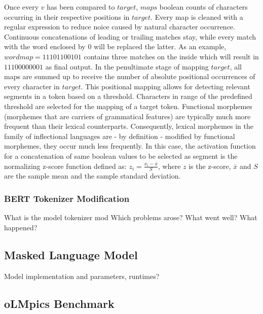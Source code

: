 Once every $v$ has been compared to $target$, $maps$ boolean counts of characters occurring in their respective positions in $target$.
Every map is cleaned with a regular expression to reduce noice caused by natural character occurrence.
Continuous concatenations of leading or trailing matches stay, while every match with the word enclosed by $0$ will be replaced the latter.
As an example, $wordmap = 11101100101$ contains three matches on the inside which will result in $11100000001$ as final output.
In the penultimate stage of mapping $target$, all maps are summed up to receive the number of absolute positional occurrences of every character in $target$.
This positional mapping allows for detecting relevant segments in a token based on a threshold.
Characters in range of the predefined threshold are selected for the mapping of a target token.
Functional morphemes (morphemes that are carriers of grammatical features) are typically much more frequent than their lexical counterparts.
Consequently, lexical morphemes in the family of inflectional languages are - by definition - modified by functional morphemes, they occur much less frequently.
In this case, the activation function for a concatenation of same boolean values to be selected as segment is the normalizing z-score function defined as: $z_{i} = \frac{x_{i} - \overline{x}}{S}$,
where $z$ is the z-score, $\overline{x}$ and $S$ are the sample mean and the sample standard deviation.


\subsubsection{BERT Tokenizer Modification}
\label{subsubsec:tokenizer-modification}
What is the model tokenizer mod
Which problems arose? What went well? What happened?



\subsection{Masked Language Model}
\label{subsec:masked-language-model}
Model implementation and parameters, runtimes?

\subsection{oLMpics Benchmark}
\label{subsec:olmpics-benchmark}

